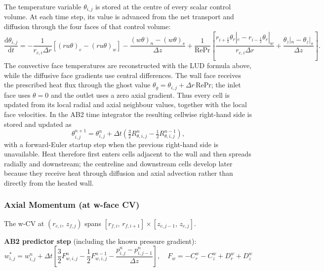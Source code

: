 \documentclass[12pt,a4paper]{article}
\newcommand{\Rey}{\text{Re}}
\newcommand{\Pran}{\text{Pr}}
\begin{document}
The temperature variable $\theta_{i,j}$ is stored at the centre of every scalar control
volume. At each time step, its value is advanced from the net transport and diffusion through
the four faces of that control volume:
\begin{equation}
        \frac{\mathrm{d}\theta_{i,j}}{\mathrm{d}t}
        = -\frac{1}{r_{c,i}\Delta r}
            \left[(r u\theta)_e-(r u\theta)_w\right]
            -\frac{(w\theta)_n-(w\theta)_s}{\Delta z}
            +\frac{1}{\Rey\Pran}\left[
            \frac{r_{i+\frac12}\theta_r|_e-r_{i-\frac12}\theta_r|_w}{r_{c,i}\Delta r}
            +\frac{\theta_z|_n-\theta_z|_s}{\Delta z}\right].
        \label{eq:temperature_cell_balance}
\end{equation}
The convective face temperatures are reconstructed with the LUD formula above, while the
diffusive face gradients use central differences. The wall face receives the prescribed heat
flux through the ghost value
$\theta_g=\theta_{i,j}+\Delta r\,\Rey\Pran$; the inlet face uses $\theta=0$ and the
outlet uses a zero axial gradient. Thus every cell is updated from its local radial and axial
neighbour values, together with the local face velocities. In the AB2 time integrator the
resulting cellwise right-hand side is stored and updated as
\begin{equation}
        \theta_{i,j}^{n+1}=\theta_{i,j}^{n}+\Delta t
        \left(\tfrac32 R_{\theta,i,j}^{n}-\tfrac12 R_{\theta,i,j}^{n-1}\right),
\end{equation}
with a forward-Euler startup step when the previous right-hand side is unavailable. Heat
therefore first enters cells adjacent to the wall and then spreads radially and downstream;
the centreline and downstream cells develop later because they receive heat through diffusion
and axial advection rather than directly from the heated wall.

\subsubsection{Axial Momentum (at w-face CV)}

The w-CV at $(r_{c,i},\, z_{f,j})$ spans $[r_{f,i},\, r_{f,i+1}] \times [z_{c,j-1},\, z_{c,j}]$.

\textbf{AB2 predictor step} (including the known pressure gradient):
\begin{equation}
\boxed{
    w^*_{i,j} = w^n_{i,j} + \Delta t\left[
    \frac{3}{2}F^n_{w,i,j}-\frac{1}{2}F^{n-1}_{w,i,j}
    -\frac{p^n_{i,j}-p^n_{i,j-1}}{\Delta z}\right],
    \quad F_w=-C_r^w-C_z^w+D_r^w+D_z^w
}
\label{eq:predictor_w}
\end{equation}
\end{document}

